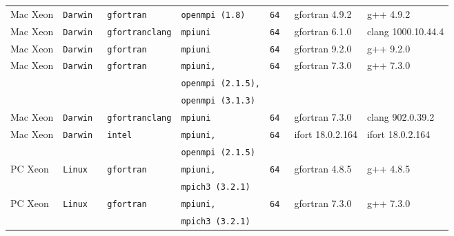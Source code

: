 \begin{longtable}{lllllll}
Mac Xeon       &\tt Darwin &\tt gfortran     &\tt openmpi \footnotesize (1.8)    &\tt 64           & gfortran \footnotesize 4.9.2        & g++ \footnotesize 4.9.2           \\
Mac Xeon       &\tt Darwin &\tt \footnotesize gfortranclang&\tt mpiuni           &\tt 64           & gfortran \footnotesize 6.1.0        & clang \footnotesize 1000.10.44.4  \\
Mac Xeon       &\tt Darwin &\tt gfortran     &\tt mpiuni           &\tt 64           & gfortran \footnotesize 9.2.0        & g++ \footnotesize 9.2.0 \\
Mac Xeon       &\tt Darwin &\tt gfortran     &\tt mpiuni,          &\tt 64           & gfortran \footnotesize 7.3.0        & g++ \footnotesize 7.3.0 \\
               &           &                 &\tt openmpi \footnotesize (2.1.5),&    &                                     &                                  \\
               &           &                 &\tt openmpi \footnotesize (3.1.3)&     &                                     &                                  \\
Mac Xeon       &\tt Darwin &\tt \footnotesize gfortranclang&\tt mpiuni           &\tt 64   & gfortran \footnotesize 7.3.0  & clang \footnotesize 902.0.39.2   \\
Mac Xeon       &\tt Darwin &\tt intel        &\tt mpiuni,          &\tt 64           & ifort \footnotesize 18.0.2.164      & ifort \footnotesize 18.0.2.164   \\
               &           &                 &\tt openmpi \footnotesize (2.1.5)&     &                                     &                                  \\
PC Xeon        &\tt Linux  &\tt gfortran     &\tt mpiuni,          &\tt 64           & gfortran \footnotesize 4.8.5        & g++ \footnotesize 4.8.5           \\
               &           &                 &\tt mpich3 \footnotesize (3.2.1) &     &                                     &                                   \\
PC Xeon        &\tt Linux  &\tt gfortran     &\tt mpiuni,          &\tt 64           & gfortran \footnotesize 7.3.0        & g++ \footnotesize 7.3.0           \\
               &           &                 &\tt mpich3 \footnotesize (3.2.1) &     &                                     &                                   \\

\end{longtable}
